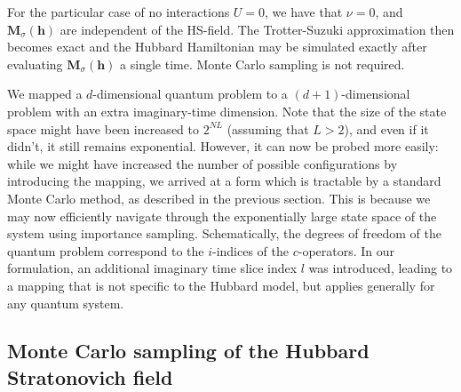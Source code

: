 For the particular case of no interactions $U = 0$, we have that $\nu = 0$, and $\bm M_\sigma (\bm h)$ are independent of the HS-field. 
The Trotter-Suzuki approximation then becomes exact and the Hubbard Hamiltonian may be simulated exactly after evaluating $\bm M_\sigma (\bm h)$ a single time.
Monte Carlo sampling is not required.

We mapped a $d$-dimensional quantum problem to a $(d+1)$-dimensional  problem with an extra imaginary-time dimension.
Note that the size of the state space might have been increased to $2^{NL}$ (assuming that $L > 2$), and even if it didn't, it still remains exponential.
However, it can now be probed more easily: while we might have increased the number of possible configurations by introducing the mapping, we arrived at a form which is tractable by a standard Monte Carlo method, as described in the previous section.
This is because we may now efficiently navigate through the exponentially large state space of the system using importance sampling.
Schematically, the degrees of freedom of the quantum problem correspond to the $i$-indices of the $c$-operators.
In our formulation, an additional imaginary time slice index $l$ was introduced, leading to a mapping that is not specific to the Hubbard model, but applies generally for any quantum system.

\subsection{Monte Carlo sampling of the Hubbard Stratonovich field}
\label{subsec:mc_hs}

